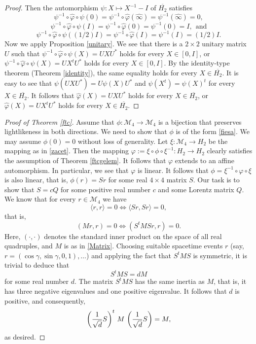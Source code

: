 \documentclass[10pt]{amsart}
\theoremstyle{definition}
\theoremstyle{remark}
\numberwithin{subsection}{section}
\numberwithin{equation}{section}
\newcommand\cM{{\mathcal{M}}}
\newcommand\oH{{\overline{H_2}}}
\newcommand\oi{{\widehat{\infty}}}
\begin{document}
\begin{proof}
Then the automorphism $\psi \colon X\mapsto X^{-1}-I$ of $\oH$ satisfies 
\[
\psi^{-1}\circ \hat{\varphi}\circ\psi(0) = \psi^{-1}\circ \hat{\varphi}(\oi) = \psi^{-1}(\oi)=0,
\]
\[
\psi^{-1}\circ \hat{\varphi}\circ\psi(I)=\psi^{-1}\circ \hat{\varphi}(0) = \psi^{-1}(0) =I,\ \ \text{and}
\]
\[
\psi^{-1}\circ \hat{\varphi}\circ\psi((1/2)I)=\psi^{-1}\circ \hat{\varphi}(I) =\psi^{-1}(I) =(1/2)I.
\]
Now we apply Proposition \ref{unitary}.
We see that there is a $2\times 2$ unitary matrix $U$ such that $\psi^{-1}\circ \hat{\varphi}\circ\psi(X)=UXU^*$ holds for every $X\in [0, I]$, or $\psi^{-1}\circ \hat{\varphi}\circ\psi(X)=UX^tU^*$ holds for every $X\in [0, I]$. 
By the identity-type theorem (Theorem \ref{identity}), the same equality holds for every $X\in \oH$. 
It is easy to see that $\psi(UXU^*)=U\psi(X)U^*$ and $\psi(X^t)=\psi(X)^t$ for every $X\in \oH$. 
It follows that $\hat{\varphi}(X)=UXU^*$ holds for every $X\in \oH$, or $\hat{\varphi}(X)=UX^tU^*$ holds for every $X\in \oH$. 
\end{proof}


\begin{proof}[Proof of Theorem \ref{ftc}]
Assume that $\phi\colon \cM_4\to \cM_4$ is a bijection that preserves lightlikeness in both directions. 
We need to show that $\phi$ is of the form \eqref{fiesa}. 
We may assume $\phi(0)=0$ without loss of generality. 
Let $\xi\colon \mathcal{M}_4\to H_2$ be the mapping as in \eqref{zacet}.
Then the mapping $\varphi:=\xi\circ \phi\circ \xi^{-1}\colon H_2\to H_2$ clearly satisfies the assumption of Theorem \ref{ftcgelem}. 
It follows that $\varphi$ extends to an affine automorphism.
In particular, we see that $\varphi$ is linear.  
It follows that $\phi=\xi^{-1}\circ \varphi\circ \xi$ is also linear, that is, $\phi (r) = Sr$ for some real $4\times 4$ matrix $S$. Our task is to show that $S=cQ$ for some positive real number $c$ and some Lorentz matrix $Q$.
We know that for every $r \in \mathcal{M}_4$ we have
\[
\langle r,r \rangle = 0 \iff \langle Sr, Sr \rangle = 0,
\]
that is,
\[
(M r,r ) = 0 \iff (S^t M Sr, r ) = 0.
\]
Here, $(\cdot , \cdot )$ \index{$(\cdot \, , \cdot)$} denotes the standard inner product on the space of all real quadruples, and $M$ is as in \eqref{Matrix}.  Choosing suitable spacetime events $r$ (say, $r = (\cos \gamma, \sin \gamma, 0 , 1), \ldots$) and applying the fact that $S^t MS$ is symmetric, it is trivial to deduce that
\[
S^t MS = dM
\]
for some real number $d$. The matrix $S^t MS$ has the same inertia as $M$, that is, it has three negative eigenvalues and one positive eigenvalue. It follows that $d$ is positive, and consequently,
\[
\left( {1 \over \sqrt{d}} S \right)^t \, M \, \left( {1 \over \sqrt{d}} S \right) = M,
\]
as desired.
\end{proof}
\end{document}
